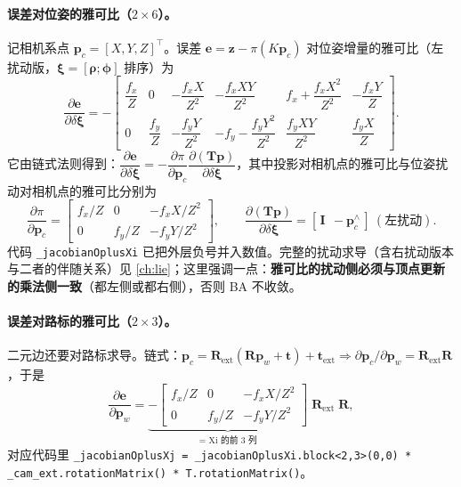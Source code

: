 \paragraph{误差对位姿的雅可比（$2\times6$）。}
记相机系点 $\mathbf{p}_c=[X,Y,Z]^\top$。误差 $\mathbf{e}=\mathbf{z}-\pi(K\mathbf{p}_c)$ 对位姿增量的雅可比（左扰动版，$\boldsymbol\xi=[\boldsymbol\rho;\boldsymbol\phi]$ 排序）为
\begin{equation}
\frac{\partial \mathbf{e}}{\partial \delta\boldsymbol\xi}=
-\begin{bmatrix}
\dfrac{f_x}{Z} & 0 & -\dfrac{f_x X}{Z^2} & -\dfrac{f_x XY}{Z^2} & f_x+\dfrac{f_x X^2}{Z^2} & -\dfrac{f_x Y}{Z}\\[2.0ex]
0 & \dfrac{f_y}{Z} & -\dfrac{f_y Y}{Z^2} & -f_y-\dfrac{f_y Y^2}{Z^2} & \dfrac{f_y XY}{Z^2} & \dfrac{f_y X}{Z}
\end{bmatrix}.
\label{eq:sys-jac-pose}
\end{equation}
它由链式法则得到：$\dfrac{\partial\mathbf{e}}{\partial\delta\boldsymbol\xi}=-\dfrac{\partial\pi}{\partial\mathbf{p}_c}\dfrac{\partial(\mathbf{T}\mathbf{p})}{\partial\delta\boldsymbol\xi}$，其中投影对相机点的雅可比与位姿扰动对相机点的雅可比分别为
\begin{equation}
\frac{\partial\pi}{\partial\mathbf{p}_c}=\begin{bmatrix}f_x/Z&0&-f_xX/Z^2\\0&f_y/Z&-f_yY/Z^2\end{bmatrix},\qquad
\frac{\partial(\mathbf{T}\mathbf{p})}{\partial\delta\boldsymbol\xi}=[\,\mathbf{I}\ \ -\mathbf{p}_c^\wedge\,]\ (\text{左扰动}).
\label{eq:sys-jac-chain}
\end{equation}
代码 \texttt{\_jacobianOplusXi} 已把外层负号并入数值。完整的扰动求导（含右扰动版本与二者的伴随关系）见 \cref{ch:lie}；这里强调一点：\textbf{雅可比的扰动侧必须与顶点更新的乘法侧一致}（都左侧或都右侧），否则 BA 不收敛。

\paragraph{误差对路标的雅可比（$2\times3$）。}
二元边还要对路标求导。链式：$\mathbf{p}_c=\mathbf{R}_{\mathrm{ext}}(\mathbf{R}\mathbf{p}_w+\mathbf{t})+\mathbf{t}_{\mathrm{ext}}\Rightarrow\partial\mathbf{p}_c/\partial\mathbf{p}_w=\mathbf{R}_{\mathrm{ext}}\mathbf{R}$，于是
\begin{equation}
\frac{\partial \mathbf{e}}{\partial \mathbf{p}_w}
=\underbrace{-\begin{bmatrix}f_x/Z&0&-f_xX/Z^2\\0&f_y/Z&-f_yY/Z^2\end{bmatrix}}_{\text{= Xi 的前 3 列}}\;\mathbf{R}_{\mathrm{ext}}\;\mathbf{R},
\label{eq:sys-jac-point}
\end{equation}
对应代码里 \verb|_jacobianOplusXj = _jacobianOplusXi.block<2,3>(0,0) * _cam_ext.rotationMatrix() * T.rotationMatrix()|。

